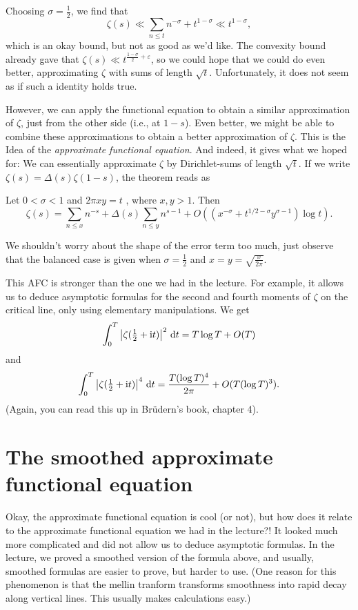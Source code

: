 \documentclass[a4paper,11pt]{article}
\begin{document}
Choosing $\sigma = \frac 12$, we find that 
\[
    \zeta(s) \ll \sum_{n \leq t} n^{-\sigma} + t^{1-\sigma} \ll t^{1- \sigma},
\]
which is an okay bound, but not as good as we'd like. The convexity bound already 
gave that $\zeta(s) \ll t^{\frac{1-\sigma}2 + \varepsilon}$, so we could hope 
that we could do even better, approximating $\zeta$ with sums of length $\sqrt t$.
Unfortunately, it does not seem as if such a identity holds true. 

However, we can apply the functional equation to obtain a similar approximation
of $\zeta$, just from the other side (i.e., at $1-s$). Even better, we might be
able to combine these approximations to obtain a better approximation of 
$\zeta$. This is the Idea of the \textit{approximate functional equation}. 
And indeed, it gives what we hoped for: We can essentially approximate $\zeta$ by
Dirichlet-sums of length $\sqrt t$. If we write $\zeta(s) = \Delta(s) \zeta(1-s)$,
the theorem reads as
\begin{thm}
    Let $0 < \sigma < 1$ and $2 \pi xy = t$ , where $x,y > 1$. Then
    \[
    \zeta(s) = \sum_{n \leq x}n^{-s} + \Delta(s) \sum_{n \leq y} n^{s-1} 
    + O((x^{-\sigma} + t^{1/2-\sigma} y^{\sigma-1}) \log t).
    \]
\end{thm}
We shouldn't worry about the shape of the error term too much, just observe that 
the balanced case is given when $\sigma = \frac 12$ and $x=y= \sqrt{\frac x
{2\pi}}.$ 

This AFC is stronger than the one we had in the lecture. For example, it allows
us to deduce asymptotic formulas for the second and fourth moments of $\zeta$
on the critical line, only using elementary manipulations. We get
\[
    \int_0^T \left\lvert \zeta(\tfrac 12 + \mathrm i t) \right\rvert^2 \mathrm{\,d} t = T \log T + O(T)
\]
and 
\[
    \int_0^T \left\lvert \zeta(\tfrac 12 + \mathrm i t) \right\rvert^4 \mathrm{\,d} t = \frac{T (\log T)^4}{2\pi} + 
    O(T(\log T)^3).
\]
(Again, you can read this up in Brüdern's book, chapter 4).



\section{The smoothed approximate functional equation} %
\label{sec:Our approximate functional equation}
Okay, the approximate functional equation is cool (or not), but how does it relate
to the approximate functional equation we had in the lecture?! It looked much
more complicated and did not
allow us to deduce asymptotic formulas. In the lecture, we proved a smoothed
version of the formula above, and usually, smoothed formulas are easier to
prove, but harder to use. (One reason for this phenomenon is that 
the mellin tranform transforms smoothness into rapid
decay along vertical lines. This usually makes calculations easy.)
\end{document}
